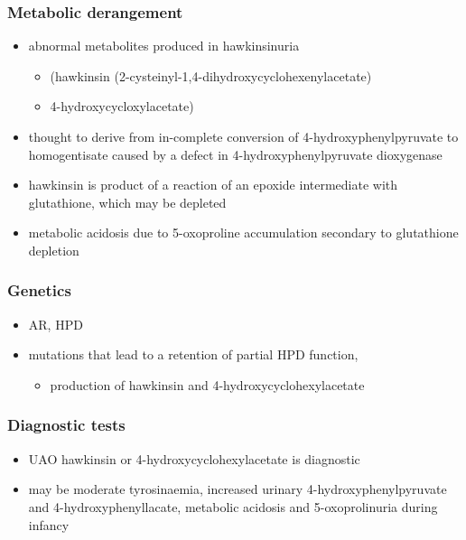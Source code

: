 \documentclass{scrartcl}
\begin{document}
\subsubsection{Metabolic derangement}
\label{sec:org69b3a61}
\begin{itemize}
\item abnormal metabolites produced in hawkinsinuria
\begin{itemize}
\item (hawkinsin (2-cysteinyl-1,4-dihydroxycyclohexenylacetate)
\item 4-hydroxycycloxylacetate)
\end{itemize}
\item thought to derive from in-complete conversion of
4-hydroxyphenylpyruvate to homogentisate caused by a defect in
4-hydroxyphenylpyruvate dioxygenase
\end{itemize}
\begin{itemize}
\item hawkinsin is product of a reaction of an epoxide intermediate with
glutathione, which may be depleted
\item metabolic acidosis due to 5-oxoproline accumulation secondary to
glutathione depletion
\end{itemize}

\subsubsection{Genetics}
\label{sec:org1535e95}
\begin{itemize}
\item AR, HPD
\item mutations that lead to a retention of partial HPD function,
\begin{itemize}
\item production of hawkinsin and 4-hydroxycyclohexylacetate
\end{itemize}
\end{itemize}
\subsubsection{Diagnostic tests}
\label{sec:org3fce98e}
\begin{itemize}
\item UAO hawkinsin or 4-hydroxycyclohexylacetate is diagnostic
\item may be moderate tyrosinaemia, increased urinary
4-hydroxyphenylpyruvate and 4-hydroxyphenyllacate, metabolic
acidosis and 5-oxoprolinuria during infancy
\end{itemize}
\end{document}
